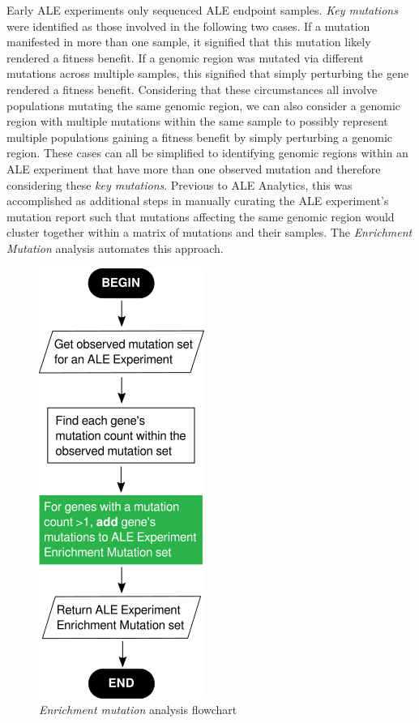 \documentclass[12pt,final,masters,chapterheads]{ucsd}  %
\begin{document}
Early ALE experiments only sequenced ALE endpoint samples. \textit{Key mutations} were identified as those involved in the following two cases. If a mutation manifested in more than one sample, it signified that this mutation likely rendered a fitness benefit. If a genomic region was mutated via different mutations across multiple samples, this signified that simply perturbing the gene rendered a fitness benefit. Considering that these circumstances all involve populations mutating the same genomic region, we can also consider a genomic region with multiple mutations within the same sample to possibly represent multiple populations gaining a fitness benefit by simply perturbing a genomic region. These cases can all be simplified to identifying genomic regions within an ALE experiment that have more than one observed mutation and therefore considering these \textit{key mutations}. Previous to ALE Analytics, this was accomplished as additional steps in manually curating the ALE experiment's mutation report such that mutations affecting the same genomic region would cluster together within a matrix of mutations and their samples. The \textit{Enrichment Mutation} analysis automates this approach.

\begin{figure}[h!]
  \caption{\textit{Enrichment mutation} analysis flowchart}
  \centering
  \includegraphics{enrichment_mutation_flowchart.png}
\end{figure}
\end{document}
